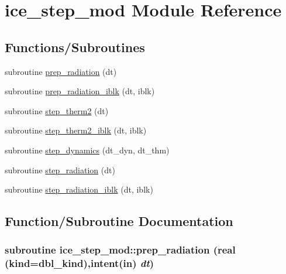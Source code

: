 \hypertarget{namespaceice__step__mod}{
\section{ice\_\-step\_\-mod Module Reference}
\label{namespaceice__step__mod}
}
\subsection*{Functions/Subroutines}
\begin{DoxyCompactItemize}
\item 
subroutine \hyperlink{namespaceice__step__mod_a0b4e1b00567ef101191e7c8c27b21829}{prep\_\-radiation} (dt)
\item 
subroutine \hyperlink{namespaceice__step__mod_a39289f79dee62dcc8102504d118c616c}{prep\_\-radiation\_\-iblk} (dt, iblk)
\item 
subroutine \hyperlink{namespaceice__step__mod_a4f84e9d5e596f23acbbe44ac3b9fdf25}{step\_\-therm2} (dt)
\item 
subroutine \hyperlink{namespaceice__step__mod_a81aa72f95f97b932fe2cd47da7c53755}{step\_\-therm2\_\-iblk} (dt, iblk)
\item 
subroutine \hyperlink{namespaceice__step__mod_a9b4ebd333313b56f42a75e8456969dd9}{step\_\-dynamics} (dt\_\-dyn, dt\_\-thm)
\item 
subroutine \hyperlink{namespaceice__step__mod_a9e4459b869b4b233da16c02d6b92e975}{step\_\-radiation} (dt)
\item 
subroutine \hyperlink{namespaceice__step__mod_a9261563c1a6fee389549374e31fb0142}{step\_\-radiation\_\-iblk} (dt, iblk)
\end{DoxyCompactItemize}


\subsection{Function/Subroutine Documentation}
\hypertarget{namespaceice__step__mod_a0b4e1b00567ef101191e7c8c27b21829}{
\subsubsection[{prep\_\-radiation}]{\setlength{\rightskip}{0pt plus 5cm}subroutine ice\_\-step\_\-mod::prep\_\-radiation (real (kind=dbl\_\-kind),intent(in) {\em dt})}}
\label{namespaceice__step__mod_a0b4e1b00567ef101191e7c8c27b21829}


